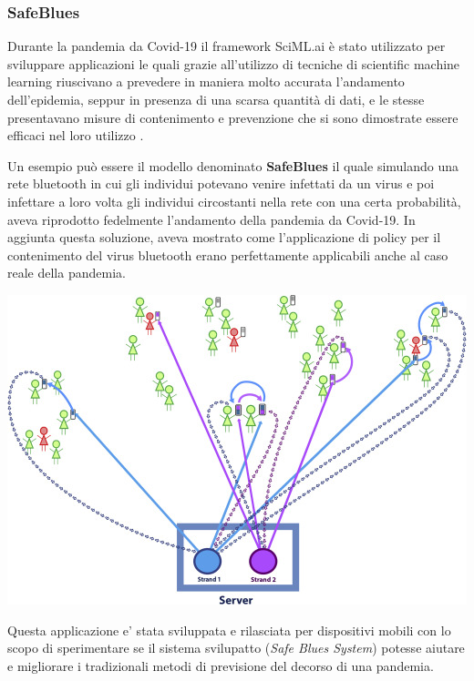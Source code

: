 \subsubsection{SafeBlues}
Durante la pandemia da Covid-19 il framework SciML.ai è stato 
utilizzato per sviluppare applicazioni le quali grazie 
all’utilizzo di tecniche di scientific machine learning 
riuscivano a prevedere in maniera molto accurata l’andamento 
dell’epidemia, seppur in presenza di una scarsa quantità di dati,
e le stesse presentavano misure di contenimento e prevenzione 
che si sono dimostrate essere efficaci nel loro utilizzo
\cite{10.1371/journal.pdig.0000142} \cite{DANDEKAR2021100220}. 

Un esempio può essere il modello denominato \textbf{SafeBlues} 
\cite{10.1371/journal.pdig.0000142} \cite{DANDEKAR2021100220} 
il quale simulando una rete bluetooth in cui gli individui potevano 
venire infettati da un virus e poi infettare a loro volta gli 
individui circostanti nella rete con una certa probabilità, 
aveva riprodotto fedelmente l’andamento della pandemia da Covid-19. 
In aggiunta questa soluzione, aveva mostrato come 
l’applicazione di policy per il contenimento del virus 
bluetooth erano perfettamente applicabili anche al caso 
reale della pandemia.

\begin{minipage}{\linewidth}
    \centering
    \includegraphics[width=\textwidth]{img/gr2.jpg}
    \label{fig:SafeBlues_1}
\end{minipage}

Questa applicazione e' stata sviluppata e rilasciata per dispositivi
mobili con lo scopo di sperimentare se il sistema svilupatto (\emph{Safe Blues System})
potesse aiutare e migliorare i tradizionali metodi di previsione 
del decorso di una pandemia.